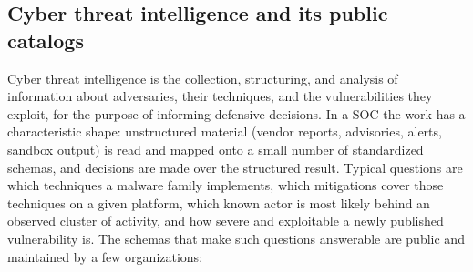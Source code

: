 \documentclass[twocolumn]{svjour3}
\begin{document}
\subsection{Cyber threat intelligence and its public catalogs}\label{sec:bg-cti}
Cyber threat intelligence is the collection, structuring, and analysis of information about adversaries, their techniques, and the vulnerabilities they exploit, for the purpose of informing defensive decisions. In a SOC the work has a characteristic shape: unstructured material (vendor reports, advisories, alerts, sandbox output) is read and mapped onto a small number of standardized schemas, and decisions are made over the structured result. Typical questions are which techniques a malware family implements, which mitigations cover those techniques on a given platform, which known actor is most likely behind an observed cluster of activity, and how severe and exploitable a newly published vulnerability is. The schemas that make such questions answerable are public and maintained by a few organizations:
\end{document}
